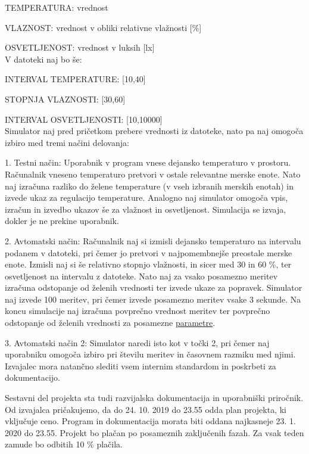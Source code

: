 \documentclass[a4paper,12pt]{article}
\begin{document}
	TEMPERATURA: vrednost 

	VLAZNOST: vrednost v obliki relativne vlažnosti [\%] 

	OSVETLJENOST: vrednost v luksih [lx] 
	\\
	V datoteki naj bo še: 

	INTERVAL TEMPERATURE: [10,40]
	
	STOPNJA VLAZNOSTI: [30,60]

	INTERVAL OSVETLJENOSTI: [10,10000] 
	\\
	Simulator naj pred pričetkom prebere 
	vrednosti iz datoteke, nato pa naj omogoča izbiro med tremi načini delovanja: 

	1. Testni način: Uporabnik v program vnese dejansko temperaturo v prostoru. Računalnik vneseno 
	temperaturo pretvori v ostale relevantne merske enote. Nato naj izračuna razliko do 
	želene temperature (v vseh izbranih merskih enotah) in izvede ukaz za regulacijo 
	temperature. Analogno naj simulator omogoča vpis, izračun in izvedbo ukazov še za 
	vlažnost in osvetljenost. Simulacija se izvaja, dokler je ne prekine uporabnik. 
	
	2. Avtomatski način: Računalnik naj si izmisli dejansko temperaturo na intervalu 
	podanem v datoteki, pri čemer jo pretvori v najpomembnejše preostale merske enote. 
	Izmisli naj si še relativno stopnjo vlažnosti, in sicer med 30 in 60 \%, ter osvetljenost 
	na intervalu z datoteke. Nato naj za vsako posamezno meritev izračuna odstopanje od 
	želenih vrednosti ter izvede ukaze za popravek. Simulator naj izvede 100 meritev, pri 
	čemer izvede posamezno meritev vsake 3 sekunde. Na koncu simulacije naj izračuna 
	povprečno vrednost meritev ter povprečno odstopanje od želenih vrednosti za posamezne 
	\textcolor{red!80!}{\hyperlink{subsection.1.8}{parametre}}. 

	3. Avtomatski način 2: Simulator naredi isto kot v točki 2, pri čemer 
	naj uporabniku omogoča izbiro pri številu meritev in časovnem razmiku med njimi. 
	Izvajalec mora natančno slediti vsem internim standardom in poskrbeti za dokumentacijo. 
	
	Sestavni del projekta sta tudi razvijalska dokumentacija in uporabniški priročnik. 
	Od izvajalca pričakujemo, da do 24. 10. 2019 do 23.55 odda plan projekta, ki vključuje ceno. 
	Program in dokumentacija morata biti oddana najkasneje 23. 1. 2020 do 23.55. 
	Projekt bo plačan po posameznih zaključenih fazah. Za vsak teden zamude bo odbitih 10 \% plačila. 
	\\
	
\end{document}
